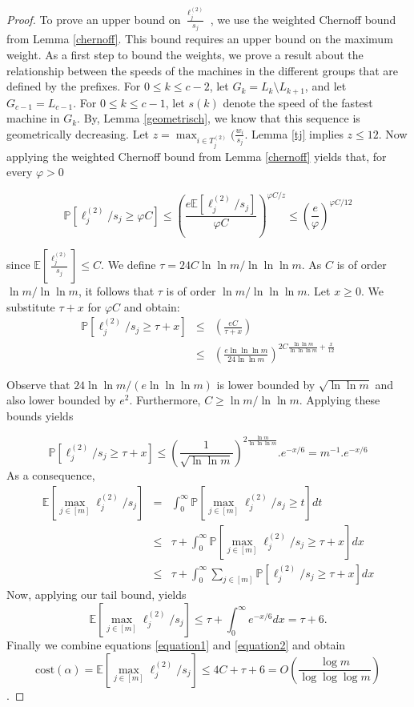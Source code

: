 \documentclass[a4paper,11pt]{article}
\renewcommand{\P}{{\mathbb P}}
\newcommand{\E}{{\mathbb E}}
\newcommand{\cost}{\text{cost}}
\begin{document}
\begin{proof}
To prove an upper bound on $\frac{\ell_j^{(2)}}{s_j}$ , we use the weighted Chernoff bound from Lemma \ref{chernoff}. This bound requires an upper bound on the maximum weight. As a first step to bound the weights, we prove a result about the relationship between the speeds of the machines in the different groups that are defined by the prefixes. For $0 \leq k \leq c-2$, let $G_k = L_k\setminus L_{k+1}$, and let $G_{c-1}=L_{c-1}$. For $0 \leq k \leq c-1$, let $s(k)$ denote the speed of the fastest machine in $G_k$. By, Lemma \ref{geometrisch}, we know that this sequence is geometrically decreasing. Let $z=\max_{i\in T_j^{(2)}}(\frac{w_i}{s_j}$. Lemma \ref{tj} implies $z \leq 12$. Now applying the weighted Chernoff bound from Lemma \ref{chernoff} yields that, for every $\varphi > 0$

$$\P\left[\ell^{(2)}_j/s_j \geq \varphi C\right] \leq \left(\frac{e\E[\ell^{(2)}_j/s_j]}{\varphi C} \right) ^{\varphi C/z} \leq \left( \frac{e}{\varphi} \right)^{\varphi C/12} $$

since $\E[ \frac{\ell^{(2)}_j}{s_j}] \leq C.$ We define $\tau = 24C \ln\ln m/ \ln\ln\ln m$. As $C$ is of order $\ln m / \ln \ln m$, it follows that $\tau$ is of order $\ln m/ \ln\ln\ln m$. Let $x \geq 0$. We substitute $\tau + x$ for $\varphi C$ and obtain:
\begin{eqnarray*}
\P\left[\ell^{(2)}_j/s_j \geq \tau + x \right]  &\leq& \left(\frac{eC}{\tau+x} \right)\\
&\leq& \left(\frac{e \ln\ln\ln m}{24\ln\ln m} \right)^{2C\frac{\ln \ln m}{\ln\ln\ln m} + \frac{x}{12}}
\end{eqnarray*}

Observe that $24\ln\ln m/(e \ln\ln\ln m)$  is lower bounded by $\sqrt{\ln\ln m}$ and also lower bounded by $e^2$. Furthermore, $C \geq \ln m / \ln\ln m$. Applying these bounds yields

$$\P\left[\ell^{(2)}_j/s_j \geq \tau + x \right] \leq \left(\frac{1}{\sqrt{\ln \ln m}} \right)^{2\frac{\ln m}{\ln \ln \ln m}}.e^{-x/6} = m^{-1}.e^{-x/6}$$
As a consequence,
\begin{eqnarray*}
\E\left[\displaystyle\max_{j\in[m]}{\ell_j^{(2)}/s_j}\right] &=& \displaystyle\int^\infty_0{\P\left[\displaystyle\max_{j\in[m]}{\ell_j^{(2)}/s_j} \geq t  \right]dt}\\
&\leq& \tau + \displaystyle\int^\infty_0{\P\left[\displaystyle\max_{j\in[m]}{\ell_j^{(2)}/s_j} \geq \tau + x \right]dx} \\
&\leq& \tau + \displaystyle\int^\infty_0{\displaystyle\sum_{j\in[m]}\P\left[\ell_j^{(2)}/s_j  \geq \tau + x \right] dx}
\end{eqnarray*}
Now, applying our tail bound, yields
\begin{equation}\label{equation2}
\E\left[\displaystyle\max_{j\in[m]}{\ell_j^{(2)}/s_j}\right] \leq \tau + \displaystyle\int^\infty_0 e^{-x/6} dx = \tau + 6.
\end{equation}
Finally we combine equations \ref{equation1} and \ref{equation2} and obtain
$$\cost(\alpha) = \E\left[\displaystyle\max_{j\in[m]}{\ell_j^{(2)}/s_j}\right] \leq 4C + \tau + 6 = O\left(\frac{\log m}{\log \log \log m}\right)$$.
\end{proof}
\end{document}
